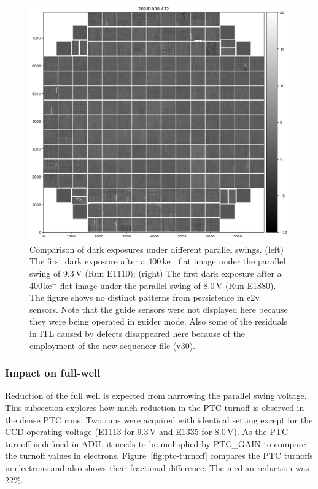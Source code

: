 \begin{figure}
\begin{minipage}[b]{0.45\textwidth}
\includegraphics[width=\textwidth]{figures/E1880dp80.png}
\end{minipage}
\caption{Comparison of dark exposures under different parallel swings. (left) The first dark exposure after a 400\,ke$^-$ flat image under the parallel swing of 9.3\,V (Run E1110); (right) The first dark exposure after a 400\,ke$^-$ flat image under the parallel swing of 8.0\,V (Run E1880). The figure shows no distinct patterns from persistence in e2v sensors. Note that the guide sensors were not displayed here because they were being operated in guider mode. Also some of the residuals in ITL caused by defects disappeared here because of the employment of the new sequencer file (v30).}
\label{fig:persistence-reduction}
\end{figure}



\subsubsection{Impact on full-well}\label{impact-on-full-well}

Reduction of the full well is expected from narrowing the parallel swing
voltage. This subsection explores how much reduction in the PTC turnoff
is observed in the dense PTC runs. Two runs were acquired with identical
setting except for the CCD operating voltage (E1113 for 9.3\,V and E1335
for 8.0\,V). As the PTC turnoff is defined in ADU, it needs to be
multiplied by PTC\_GAIN to compare the turnoff values in electrons.
Figure~\ref{fig:ptc-turnoff} compares the PTC turnoffs in electrons and also shows their
fractional difference. The median reduction was 22\%.

